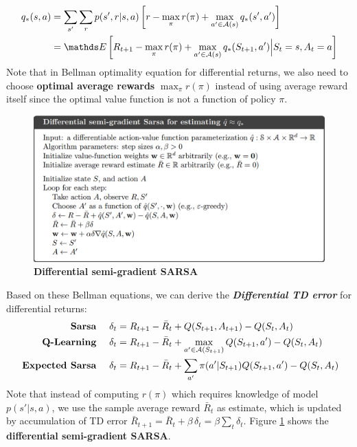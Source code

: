 \documentclass[11pt]{article}
\begin{document}
\begin{itemize}
\begin{align}
 q_{*}(s, a) &=\sum_{s'}\sum_{r}p(s', r|s, a)\brac{r  - \max_{\pi}r(\pi) +  \max_{a'\in \cA(s)}q_{*}(s', a')}  \label{eqn: bellman_opt_eqn_value_action_diff}\\
 &=  \E{}{R_{t+1}  - \max_{\pi}r(\pi)+ \max_{a'\in \cA(s)}q_{*}(S_{t+1}, a') \Big| S_{t}=s, A_{t}=a} \label{eqn: bellman_opt_eqn_value_action_diff_2}
\end{align} Note that in Bellman optimality equation for differential returns, we also need to choose \textbf{optimal average rewards} $\max_{\pi}r(\pi)$ instead of using average reward itself since the optimal value function is not a function of policy $\pi$.
\begin{figure}
\begin{minipage}[t]{1\linewidth}
  \centering
  \centerline{\includegraphics[scale = 0.3]{semi_grad_sarsa_diff.png}}
\end{minipage}
\caption{\footnotesize{\textbf{Differential semi-gradient SARSA }}}
\label{fig: semi_grad_sarsa_diff}
\end{figure}
Based on these Bellman equations, we can derive the \textbf{\emph{Differential TD error}} for differential returns:
\begin{align}
\text{  \textbf{Sarsa} }\quad\delta_{t} &= R_{t+1} -  \bar{R}_{t}  +  Q(S_{t+1}, A_{t+1}) -  Q(S_{t}, A_{t}) \label{eqn: sarsa_diff}\\
\text{  \textbf{Q-Learning} }\quad\delta_{t} &=  R_{t+1}  -  \bar{R}_{t}  +  \max_{a'\in {\mathcal A}(S_{t+1})}Q(S_{t+1}, a') -  Q(S_{t}, A_{t})  \label{eqn: q_learn_diff} \\
 \text{  \textbf{Expected Sarsa} }\quad\delta_{t} &= R_{t+1}  -  \bar{R}_{t}  + \sum_{a'}\pi(a'|S_{t+1})Q(S_{t+1}, a') -  Q(S_{t}, A_{t})  \label{eqn: expected_sarsa_diff}
\end{align} Note that instead of computing $r(\pi)$ which requires knowledge of model $p(s'|s, a)$, we use the sample average reward $\bar{R}_{t}$ as estimate, which is updated by accumulation of TD error $\bar{R}_{t+1} = \bar{R}_{t} + \beta\,\delta_{t} = \beta\sum_{t}\delta_{t}$. Figure \ref{fig: semi_grad_sarsa_diff} shows the \textbf{differential semi-gradient SARSA}.
\end{itemize}
\end{document}
